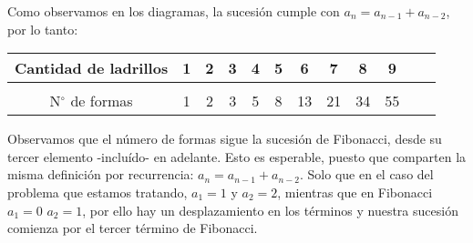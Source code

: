 \begin{center}
\end{center}

\begin{center}
\end{center}

Como observamos en los diagramas,
la sucesión cumple con \(a_n = a_{n-1} + a_{n-2}\),
por lo tanto:

\begin{center}
    \begin{tabular}{ c c c c c c c c c c c c }
        Cantidad de ladrillos   & 1 & 2 & 3 & 4 & 5 & 6  & 7  & 8  & 9  \\
        \hline                  &                                       \\ [-1em]
        N\(^{\circ}\) de formas & 1 & 2 & 3 & 5 & 8 & 13 & 21 & 34 & 55 \\
        \hline
    \end{tabular}
\end{center}

Observamos que el número de formas sigue la sucesión de Fibonacci,
desde su tercer elemento -incluído- en adelante.
Esto es esperable, puesto que comparten la misma definición por recurrencia:
\(a_n = a_{n-1} + a_{n-2}\).
Solo que en el caso del problema que estamos tratando, \(a_{1} = 1\) y 
\(a_{2} = 2\), mientras que en Fibonacci \(a_{1} = 0\) \(a_{2} = 1\),
por ello hay un desplazamiento en los términos y nuestra sucesión comienza por 
el tercer término de Fibonacci.